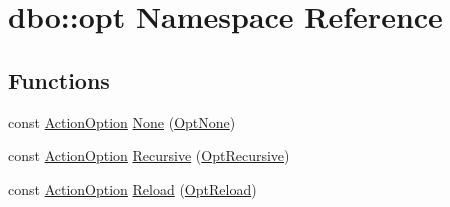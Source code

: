 \hypertarget{namespacedbo_1_1opt}{\section{dbo\+:\+:opt Namespace Reference}
\label{namespacedbo_1_1opt}
}
\subsection*{Functions}
\begin{DoxyCompactItemize}
\item 
const \hyperlink{classdbo_1_1_action_option}{Action\+Option} \hyperlink{namespacedbo_1_1opt_ab4b7820471aaf46d67dffc2ee8b91dc4}{None} (\hyperlink{namespacedbo_a47a23f634263db465e9394710b315393}{Opt\+None})
\item 
const \hyperlink{classdbo_1_1_action_option}{Action\+Option} \hyperlink{namespacedbo_1_1opt_aee9e22f75483def606cfc3424ea0b014}{Recursive} (\hyperlink{namespacedbo_af04051dd11c9b2c8692319eaeee04224}{Opt\+Recursive})
\item 
const \hyperlink{classdbo_1_1_action_option}{Action\+Option} \hyperlink{namespacedbo_1_1opt_a16bc9fe5cd36bba43868e664cb5b49e5}{Reload} (\hyperlink{namespacedbo_a8fe48d016269671188c75d0e08589cde}{Opt\+Reload})
\end{DoxyCompactItemize}


